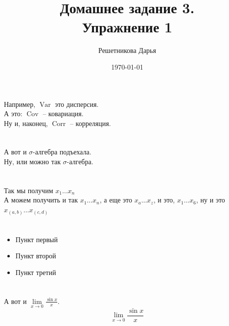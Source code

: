 \documentclass[12pt, a4paper]{article}
\title{Домашнее задание 3. \\ Упражнение 1}
\author{Решетникова Дарья}
\date{\today}
\theoremstyle{plain}              %
\theoremstyle{definition}         %
\DeclareMathOperator{\Var}{Var}
\DeclareMathOperator{\Cov}{Cov}
\DeclareMathOperator{\Corr}{Corr}
\begin{document}
\maketitle



\section{}

Например, $\Var$ это дисперсия.\\
А это: $\Cov$ -- ковариация.\\
Ну и, наконец, $\Corr$ -- корреляция. \\

\section{}
\newcommand{\s}{$\sigma$}

А вот и \s-алгебра подъехала. \\
\newcommand{\sa}{$\sigma$-алгебра}
Ну, или можно так \sa. 

\section{}
\newcommand{\xdot}{$x_1 \ldots x_n$}
Так мы получим \xdot \\
\newcommand{\com}[2]{x_{#1} \ldots x_{#2}}
А можем получить и так $\com{1}{n}$, а еще это $\com{a}{z}$, и это, $\com{1}{6}$, ну и это $\com{(a,b)}{(c,d)}$

\section{}
\renewcommand{\labelitemi}{${\color{blue}\bullet}$}
\begin{itemize}
	\item Пункт первый
	\item Пункт второй
	\item Пункт третий
\end{itemize}

\section{}
\newcommand{\llim}{\lim\limits_{x \to 0} \frac{\sin x}{x}}
А вот и $\llim$.
\[\llim\]
\end{document}
